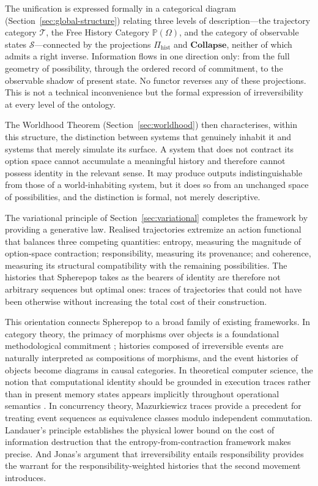 \documentclass[12pt]{article}
\theoremstyle{plain}
\theoremstyle{definition}
\theoremstyle{remark}
\newcommand{\Collapse}{\mathbf{Collapse}}
\newcommand{\PathCat}{\mathbb{P}(\Omega)}
\begin{document}
The unification is expressed formally in a categorical diagram
(Section~\ref{sec:global-structure}) relating three levels of description---the
trajectory category $\mathcal{T}$, the Free History Category $\PathCat$, and
the category of observable states $\mathcal{S}$---connected by the projections
$\Pi_{\mathrm{hist}}$ and $\Collapse$, neither of which admits a right inverse.
Information flows in one direction only: from the full geometry of possibility,
through the ordered record of commitment, to the observable shadow of present
state.  No functor reverses any of these projections.  This is not a technical
inconvenience but the formal expression of irreversibility at every level of
the ontology.

The Worldhood Theorem (Section~\ref{sec:worldhood}) then characterises, within
this structure, the distinction between systems that genuinely inhabit it and
systems that merely simulate its surface.  A system that does not contract its
option space cannot accumulate a meaningful history and therefore cannot possess
identity in the relevant sense.  It may produce outputs indistinguishable from
those of a world-inhabiting system, but it does so from an unchanged space of
possibilities, and the distinction is formal, not merely descriptive.

The variational principle of Section~\ref{sec:variational} completes the
framework by providing a generative law.  Realised trajectories extremize an
action functional that balances three competing quantities: entropy, measuring
the magnitude of option-space contraction; responsibility, measuring its
provenance; and coherence, measuring its structural compatibility with the
remaining possibilities.  The histories that Spherepop takes as the bearers of
identity are therefore not arbitrary sequences but optimal ones: traces of
trajectories that could not have been otherwise without increasing the total cost
of their construction.

This orientation connects Spherepop to a broad family of existing frameworks.
In category theory, the primacy of morphisms over objects is a foundational
methodological commitment \citep{MacLane1998}; histories composed of irreversible
events are naturally interpreted as compositions of morphisms, and the event
histories of objects become diagrams in causal categories.  In theoretical
computer science, the notion that computational identity should be grounded in
execution traces rather than in present memory states appears implicitly throughout
operational semantics \citep{Abramsky1994}.  In concurrency theory, Mazurkiewicz
traces \citep{Mazurkiewicz1987} provide a precedent for treating event sequences
as equivalence classes modulo independent commutation.  Landauer's principle
\citep{Landauer1961} establishes the physical lower bound on the cost of
information destruction that the entropy-from-contraction framework makes precise.
And Jonas's argument \citep{Jonas1979} that irreversibility entails responsibility
provides the warrant for the responsibility-weighted histories that the second
movement introduces.
\end{document}
